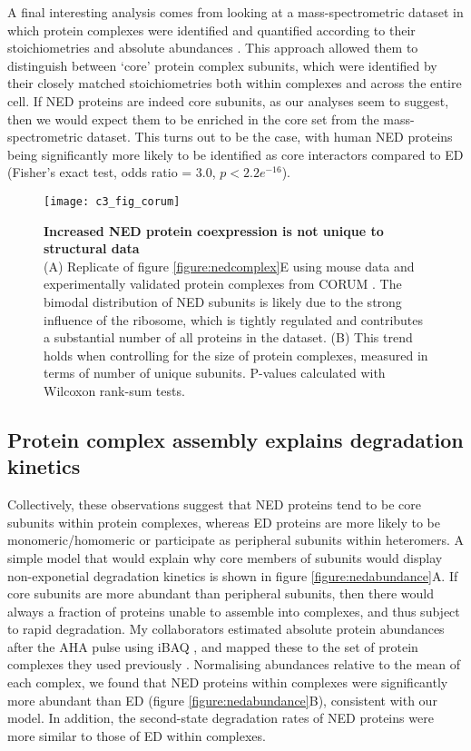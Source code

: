 \documentclass[a4paper,11pt,twoside,openright]{scrbook}
\begin{document}
A final interesting analysis comes from looking at a mass-spectrometric dataset in which protein complexes were identified and quantified according to their stoichiometries and absolute abundances \cite{Hein2015}. This approach allowed them to distinguish between `core' protein complex subunits, which were identified by their closely matched stoichiometries both within complexes and across the entire cell. If NED proteins are indeed core subunits, as our analyses seem to suggest, then we would expect them to be enriched in the core set from the mass-spectrometric dataset. This turns out to be the case, with human NED proteins being significantly more likely to be identified as core interactors compared to ED (Fisher's exact test, odds ratio = 3.0, $p < 2.2e^{-16}$).

\begin{figure}
    \texttt{[image: c3\_fig\_corum]}
    \caption[Increased NED protein coexpression is not unique to structural data]{\sffamily \textbf{Increased NED protein coexpression is not unique to structural data} \\ \small (A) Replicate of figure \ref{figure:nedcomplex}E using mouse data and experimentally validated protein complexes from CORUM \cite{Ruepp2009}. The bimodal distribution of NED subunits is likely due to the strong influence of the ribosome, which is tightly regulated and contributes a substantial number of all proteins in the dataset. (B) This trend holds when controlling for the size of protein complexes, measured in terms of number of unique subunits. P-values calculated with Wilcoxon rank-sum tests.}
    \label{figure:corum}
\end{figure}

\subsection{Protein complex assembly explains degradation kinetics}
Collectively, these observations suggest that NED proteins tend to be core subunits within protein complexes, whereas ED proteins are more likely to be monomeric/homomeric or participate as peripheral subunits within heteromers. A simple model that would explain why core members of subunits would display non-exponetial degradation kinetics is shown in figure \ref{figure:nedabundance}A. If core subunits are more abundant than peripheral subunits, then there would always a fraction of proteins unable to assemble into complexes, and thus subject to rapid degradation. My collaborators estimated absolute protein abundances after the AHA pulse using iBAQ \cite{Schwanhausser2011}, and mapped these to the set of protein complexes they used previously \cite{Ori2016}. Normalising abundances relative to the mean of each complex, we found that NED proteins within complexes were significantly more abundant than ED (figure \ref{figure:nedabundance}B), consistent with our model. In addition, the second-state degradation rates of NED proteins were more similar to those of ED within complexes.
\end{document}
